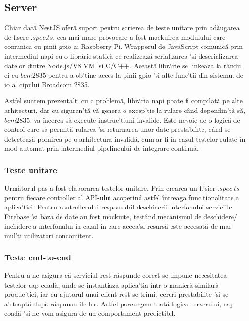 \subsection {Server}

Chiar dacă NestJS oferă suport pentru scrierea de teste unitare prin adăugarea de fisere $.spec.ts$, cea mai mare provocare a fost mockuirea modulului care comunica cu pinii \acrshort{gpio} ai Raspberry Pi. Wrapperul de JavaScript comunică prin intermediul \acrfull{napi} cu o librărie statică ce realizează serializarea 'si deserializarea datelor dintre Node.js/V8 VM 'si C/C++. Această librărie se linkeaza la rândul ei cu $bcm2835$ pentru a ob'tine acces la pinii \acrshort{gpio} 'si alte func'tii din sistemul de \acrfull{io} al cipului Broadcom 2835.

Astfel suntem prezenta'ti cu o problemă, librăria \acrshort{napi} poate fi compilată pe alte arhitecturi, dar cu siguran'tă vă genera o excep'tie la rulare când dependin'tă să, $bcm2835$, va încerca să execute instruc'tiuni invalide. Este nevoie de o logică de control care să permită rularea 'si returnarea unor date prestabilite, când se detectează pornirea pe o arhitectura invalidă, cum ar fi în cazul testelor rulate în mod automat prin intermediul pipelineului de integrare continuă.

\subsubsection {Teste unitare}

Următorul pas a fost elaborarea testelor unitare. Prin crearea un fi'sier $.spec.ts$ pentru fiecare controller al API-ului acoperind astfel întreaga func'tionalitate a aplica'tiei. Pentru controllerului responsabil deschiderii interfonului serviciile Firebase 'si baza de date au fost mockuite, testând mecanismul de deschidere/închidere a interfonului în cazul în care aceea'si resursă este accesată de mai mul'ti utilizatori concomitent.

\subsubsection {Teste end-to-end}

Pentru a ne asigura că serviciul \acrshort{rest} răspunde corect se impune necesitatea testelor cap coadă, unde se instantiaza aplica'tia într-o manieră similară produc'tiei, iar cu ajutorul unui client rest se trimit cereri prestabilite 'si se a'steaptă după răspunsurile lor. Astfel parcurgem toată logica serverului, cap-coadă 'si ne vom asigura de un comportament predictibil.

